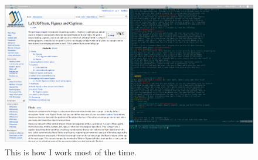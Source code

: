 \documentclass[paper=a4, fontsize=10pt]{scrartcl} %
\numberwithin{equation}{section} %
\numberwithin{figure}{section} %
\numberwithin{table}{section} %
\begin{document}
\begin{figure}[h]
    \centering
    \includegraphics[scale=0.2]{latexprogress.png}
    \caption{This is how I work most of the time.}
\end{figure}

\end{document}
